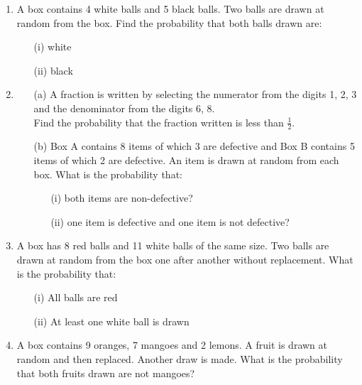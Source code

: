 \begin{enumerate}
	\item A box contains 4 white balls and 5 black balls. Two balls are drawn at random from the box. Find the probability that both balls drawn are:
		\begin{itemize}
		\item[(i)] white
		\item[(ii)] black
		\end{itemize}
	
	\item 
	\begin{itemize}
	\item[(a)] A fraction is written by selecting the numerator from the digits 1, 2, 3 and the denominator from the digits 6, 8.\\
	\noindent Find the probability that the fraction written is less than $\frac{1}{2}$.
	\item[(b)] Box A contains 8 items of which 3 are defective and Box B contains 5 items of which 2 are defective. An item is drawn at random from each box. What is the probability that:
		\begin{itemize}
		\item[(i)] both items are non-defective?
		\item[(ii)] one item is defective and one item is not defective?
		\end{itemize}
	\end{itemize}	 
		
	\item A box has 8 red balls and 11 white balls of the same size. Two balls are drawn at random from the box one after another without replacement. What is the probability that:
		\begin{itemize}
		\item[(i)] All balls are red
		\item[(ii)] At least one white ball is drawn
		\end{itemize}
		
	\item A box contains 9 oranges, 7 mangoes and 2 lemons. A fruit is drawn at random and then replaced. Another draw is made. What is the probability that both fruits drawn are not mangoes?	
	

\end{enumerate}
